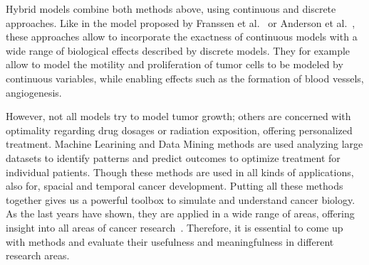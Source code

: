 Hybrid models combine both methods above, using continuous and discrete approaches. Like in the model proposed by Franssen et al.~\cite{franssen_mathematical_2019} or Anderson et al.~\cite{anderson_continuous_1998}, these approaches allow to incorporate the exactness of continuous models with a wide range of biological effects described by discrete models. They for example allow to model the motility and proliferation of tumor cells to be modeled by continuous variables, while enabling effects such as the formation of blood vessels, angiogenesis.

However, not all models try to model tumor growth; others are concerned with optimality regarding drug dosages or radiation exposition, offering personalized treatment. Machine Learining and Data Mining methods are used analyzing large datasets to identify patterns and predict outcomes to optimize treatment for individual patients. Though these methods are used in all kinds of applications, also for, spacial and temporal cancer development. Putting all these methods together gives us a powerful toolbox to simulate and understand cancer biology. As the last years have shown, they are applied in a wide range of areas, offering insight into all areas of cancer research~\cite{Yin2019-sr}. Therefore, it is essential to come up with methods and evaluate their usefulness and meaningfulness in different research areas.